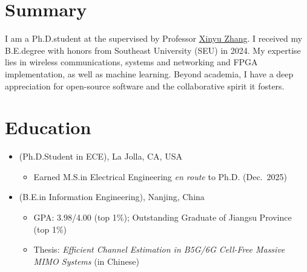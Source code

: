 \documentclass{color-cv}
\begin{document}

\maketitle

\section{Summary}
I am a Ph.D.\@ student at the  supervised by Professor \href{https://xyzhang.ucsd.edu}{\color{black}Xinyu Zhang}.
I received my B.E.\@ degree with honors from Southeast University (SEU) in 2024.
My expertise lies in wireless communications, systems and networking and FPGA implementation, as well as machine learning.
Beyond academia, I have a deep appreciation for open-source software and the collaborative spirit it fosters.

\section{Education}
\begin{itemize}
  \item {} (Ph.D.\@ Student in ECE), La Jolla, CA, USA
    \begin{itemize}
      \item Earned M.S.\@ in Electrical Engineering \textit{en route} to Ph.D. (Dec.~2025)
    \end{itemize}
  \item {} (B.E.\@ in Information Engineering), Nanjing, China
    \begin{itemize}
      \item GPA: 3.98/4.00 (top 1\%); Outstanding Graduate of Jiangsu Province (top 1\%)
      \item Thesis: \textit{Efficient Channel Estimation in B5G/6G Cell-Free Massive MIMO Systems} (in Chinese)
    \end{itemize}
\end{itemize}
\end{document}
